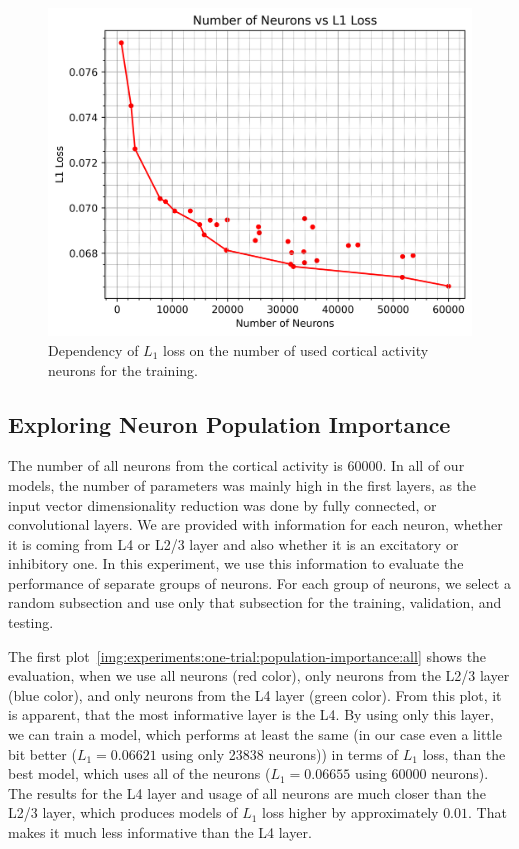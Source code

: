 \begin{figure}[H]\centering
\includegraphics[width=140mm]{img/one-trial/response_size_one_trial.png}
\caption{Dependency of $L_1$ loss on the number of used cortical activity neurons for the training.}
\label{img:experiments:one-trial:number-of-inputs}
\end{figure}


\subsection{Exploring Neuron Population Importance}
\label{experiments:one-trial:population-importance}
The number of all neurons from the cortical activity is 60000. In all of our models, the number of parameters was mainly high in the first layers, as the input vector dimensionality reduction was done by fully connected, or convolutional layers. We are provided with information for each neuron, whether it is coming from L4 or L2/3 layer and also whether it is an excitatory or inhibitory one. In this experiment, we use this information to evaluate the performance of separate groups of neurons. For each group of neurons, we select a random subsection and use only that subsection for the training, validation, and testing.

The first plot~\ref{img:experiments:one-trial:population-importance:all} shows the evaluation, when we use all neurons (red color), only neurons from the L2/3 layer (blue color), and only neurons from the L4 layer (green color). From this plot, it is apparent, that the most informative layer is the L4. By using only this layer, we can train a model, which performs at least the same (in our case even a little bit better ($L_1=0.06621$ using only 23838 neurons)) in terms of $L_1$ loss, than the best model, which uses all of the neurons ($L_1=0.06655$ using 60000 neurons). The results for the L4 layer and usage of all neurons are much closer than the L2/3 layer, which produces models of $L_1$ loss higher by approximately $0.01$. That makes it much less informative than the L4 layer.

